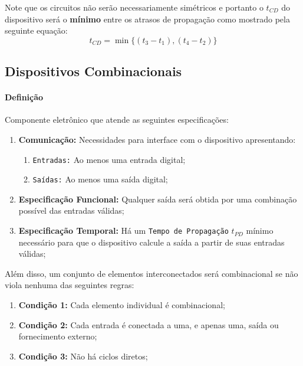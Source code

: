 \documentclass{article}
\begin{document}
            Note que os circuitos não serão necessariamente simétricos e portanto o $t_{CD}$ do dispositivo será o \textbf{mínimo} entre os atrasos de propagação como mostrado pela seguinte equação:
                \begin{equation}
                    \boxed{
                        t_{CD} = \min\{ (t_{3} - t_{1}), (t_{4} - t_{2}) \}
                    }
                \end{equation}
\newpage
        \subsection{Dispositivos Combinacionais}
            \paragraph{Definição}Componente eletrônico que atende as seguintes especificações:
                \begin{enumerate}[rightmargin = \leftmargin]
                    \item \textbf{Comunicação:} Necessidades para interface com o dispositivo apresentando:
                        \begin{enumerate}[noitemsep]
                            \item \texttt{Entradas:} Ao menos uma entrada digital;
                            \item \texttt{Saídas:} Ao menos uma saída digital;
                        \end{enumerate}

                    \item \textbf{Especificação Funcional:} Qualquer saída será obtida por uma combinação possível das entradas válidas;

                    \item \textbf{Especificação Temporal:} Há um \texttt{Tempo de Propagação} $t_{PD}$ mínimo necessário para que o dispositivo calcule a saída a partir de suas entradas válidas;
                \end{enumerate}
            Além disso, um conjunto de elementos interconectados será combinacional se não viola nenhuma das seguintes regras:
                \begin{enumerate}[noitemsep]
                    \item \textbf{Condição 1:} Cada elemento individual é combinacional;

                    \item \textbf{Condição 2:} Cada entrada é conectada a uma, e apenas uma, saída ou fornecimento externo;

                    \item \textbf{Condição 3:} Não há ciclos diretos;
                \end{enumerate}
\end{document}
